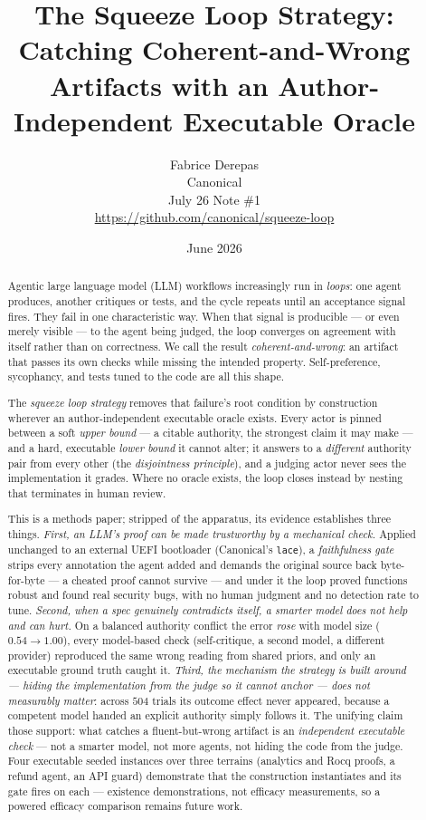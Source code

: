 \documentclass[11pt]{article}
\title{\textbf{The Squeeze Loop Strategy:}\\
\Large Catching Coherent-and-Wrong Artifacts with an Author-Independent Executable Oracle}
\author{%
  Fabrice Derepas\\[2pt]
  Canonical\\[2pt]
  July 26 Note \#1\\[2pt]
  \url{https://github.com/canonical/squeeze-loop}%
}
\date{June 2026}
\newcommand{\code}[1]{\texttt{#1}}
\begin{document}
\maketitle

\begin{abstract}
Agentic large language model (LLM) workflows increasingly run in \emph{loops}: one agent
produces, another critiques or tests, and the cycle repeats until an acceptance signal
fires. They fail in one characteristic way. When that signal is producible --- or even
merely visible --- to the agent being judged, the loop converges on agreement with itself
rather than on correctness. We call the result \emph{coherent-and-wrong}: an artifact that
passes its own checks while missing the intended property. Self-preference, sycophancy, and
tests tuned to the code are all this shape.

The \emph{squeeze loop strategy} removes that failure's root condition by construction wherever an
author-independent executable oracle exists. Every actor is pinned between a soft \emph{upper bound} ---
a citable authority, the strongest claim it may make --- and a hard, executable \emph{lower bound} it
cannot alter; it answers to a \emph{different} authority pair from every other (the \emph{disjointness
principle}), and a judging actor never sees the implementation it grades. Where no oracle exists, the
loop closes instead by nesting that terminates in human review.

This is a methods paper; stripped of the apparatus, its evidence establishes three things. \emph{First,
an LLM's proof can be made trustworthy by a mechanical check.} Applied unchanged to an external UEFI
bootloader (Canonical's \code{lace}), a \emph{faithfulness gate} strips every annotation the agent added
and demands the original source back byte-for-byte --- a cheated proof cannot survive --- and under it
the loop proved \ResRWRobust{} functions robust and found \ResRWBugsNum{} real security bugs, with no
human judgment and no detection rate to tune. \emph{Second, when a spec genuinely contradicts itself, a
smarter model does not help and can hurt.} On a balanced authority conflict the error \emph{rose} with
model size ($0.54\!\to\!1.00$), every model-based check (self-critique, a second model, a different
provider) reproduced the same wrong reading from shared priors, and only an executable ground truth
caught it. \emph{Third, the mechanism the strategy is built around --- hiding the implementation from the judge so
it cannot anchor --- does not measurably matter}: across $504$ trials its outcome effect never appeared,
because a competent model handed an explicit authority simply follows it. The unifying claim those support: what
catches a fluent-but-wrong artifact is an \emph{independent executable check} --- not a smarter model,
not more agents, not hiding the code from the judge. Four executable seeded instances over three terrains (analytics and Rocq proofs, a refund
agent, an API guard) demonstrate that the construction instantiates and its gate fires on each ---
existence demonstrations, not efficacy measurements, so a powered efficacy comparison remains future work.
\end{abstract}
\end{document}
